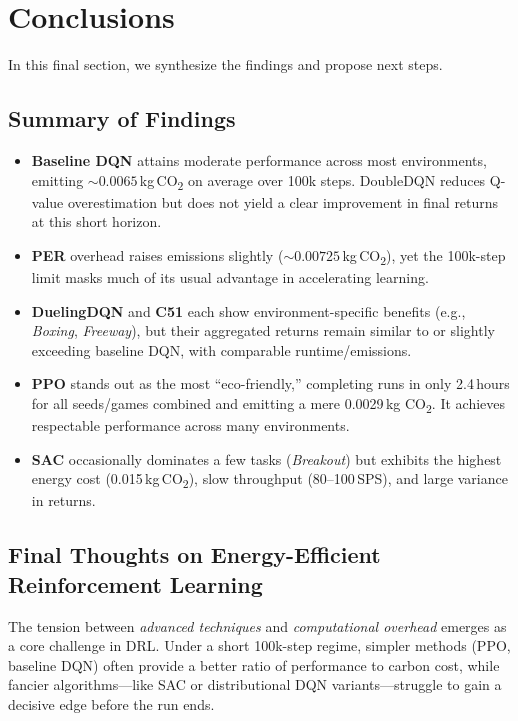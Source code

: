 \section{Conclusions}
\label{sec:conclusions}
In this final section, we synthesize the findings and propose next steps.

\subsection{Summary of Findings}
\label{subsec:summary_of_findings}

\begin{itemize}
	\item \textbf{Baseline DQN} attains moderate performance across most environments, 
	emitting $\sim0.0065$\,kg\,CO\textsubscript{2} on average over 100k steps. 
	DoubleDQN reduces Q-value overestimation but does not yield a clear improvement 
	in final returns at this short horizon.
	\item \textbf{PER} overhead raises emissions slightly 
	($\sim0.00725$\,kg\,CO\textsubscript{2}), 
	yet the 100k-step limit masks much of its usual advantage in accelerating learning.
	\item \textbf{DuelingDQN} and \textbf{C51} each show environment-specific benefits 
	(e.g., \emph{Boxing}, \emph{Freeway}), but their aggregated returns 
	remain similar to or slightly exceeding baseline DQN, 
	with comparable runtime/emissions.
	\item \textbf{PPO} stands out as the most “eco-friendly,” completing runs in only 
	2.4\,hours for all seeds/games combined and emitting a mere 0.0029\,kg CO\textsubscript{2}. 
	It achieves respectable performance across many environments.
	\item \textbf{SAC} occasionally dominates a few tasks (\emph{Breakout}) but 
	exhibits the highest energy cost (0.015\,kg\,CO\textsubscript{2}), 
	slow throughput (80--100\,SPS), and large variance in returns.
\end{itemize}

\subsection{Final Thoughts on Energy-Efficient Reinforcement Learning}
\label{subsec:final_thoughts_energy_eff}

The tension between \emph{advanced techniques} and \emph{computational overhead} emerges 
as a core challenge in DRL. Under a short 100k-step regime, simpler methods (PPO, 
baseline DQN) often provide a better ratio of performance to carbon cost, while 
fancier algorithms—like SAC or distributional DQN variants—struggle to gain a decisive edge 
before the run ends.

